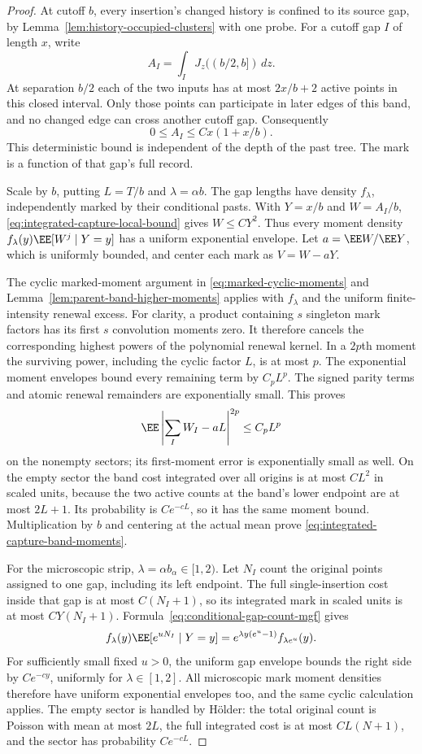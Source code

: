 \documentclass[11pt,letterpaper]{article}
\begin{document}
\begin{proof}
At cutoff $b$, every insertion's changed history is confined
to its source gap, by
Lemma~\ref{lem:history-occupied-clusters} with one probe.
For a cutoff gap $I$ of length $x$, write
\[
 A_I=\int_I J_z((b/2,b])\,dz.
\]
At separation $b/2$ each of the two inputs has at most
$2x/b+2$ active points in this closed interval. Only those
points can participate in later edges of this band, and no
changed edge can cross another cutoff gap. Consequently
\begin{equation}\label{eq:integrated-capture-local-bound}
 0\le A_I\le Cx(1+x/b).
\end{equation}
This deterministic bound is independent of the depth of the
past tree. The mark is a function of that gap's full record.

Scale by $b$, putting $L=T/b$ and $\lambda=\alpha b$.
The gap lengths have density $f_\lambda$, independently
marked by their conditional pasts. With $Y=x/b$ and
$W=A_I/b$, \eqref{eq:integrated-capture-local-bound} gives
$W\le CY^2$. Thus every moment density
$f_\lambda(y)\EE[W^j\mid Y=y]$ has a uniform exponential
envelope. Let $a=\EE W/\EE Y$, which is uniformly bounded,
and center each mark as $V=W-aY$.

The cyclic marked-moment argument in
\eqref{eq:marked-cyclic-moments} and
Lemma~\ref{lem:parent-band-higher-moments} applies with
$f_\lambda$ and the uniform finite-intensity renewal excess.
For clarity, a product containing $s$ singleton mark factors
has its first $s$ convolution moments zero. It therefore
cancels the corresponding highest powers of the polynomial
renewal kernel. In a $2p$th moment the surviving power,
including the cyclic factor $L$, is at most $p$.
The exponential moment envelopes bound every remaining term
by $C_pL^p$. The signed parity terms and atomic renewal
remainders are exponentially small. This proves
\[
 \EE\left|\sum_I W_I-aL\right|^{2p}\le C_pL^p
\]
on the nonempty sectors; its first-moment error is exponentially
small as well. On the empty sector the band cost integrated
over all origins is at most $CL^2$ in scaled units, because
the two active counts at the band's lower endpoint are at
most $2L+1$. Its probability is $Ce^{-cL}$, so it has the
same moment bound. Multiplication by $b$ and centering at
the actual mean prove
\eqref{eq:integrated-capture-band-moments}.

For the microscopic strip, $\lambda=\alpha b_\alpha\in[1,2)$.
Let $N_I$ count the original points assigned to one gap,
including its left endpoint. The full single-insertion cost
inside that gap is at most $C(N_I+1)$, so its integrated
mark in scaled units is at most $CY(N_I+1)$.
Formula~\eqref{eq:conditional-gap-count-mgf} gives
\[
 f_\lambda(y)\EE[e^{uN_I}\mid Y=y]
      =e^{\lambda y(e^u-1)}f_{\lambda e^u}(y).
\]
For sufficiently small fixed $u>0$, the uniform gap envelope
bounds the right side by $Ce^{-cy}$, uniformly for
$\lambda\in[1,2]$. All microscopic mark moment densities
therefore have uniform exponential envelopes too, and the
same cyclic calculation applies. The empty sector is handled
by H\"older: the total original count is Poisson with mean
at most $2L$, the full integrated cost is at most $CL(N+1)$,
and the sector has probability $Ce^{-cL}$.


\end{proof}
\end{document}
